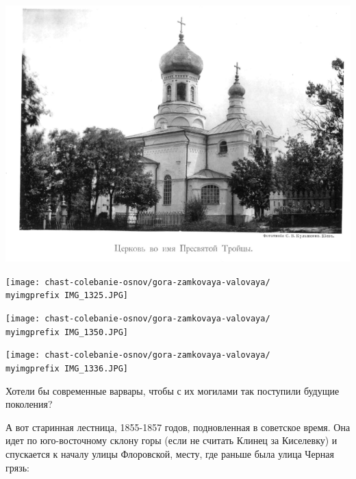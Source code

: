 \vspace*{\fill}
\begin{center}
\includegraphics[width=\linewidth]{chast-colebanie-osnov/gora-zamkovaya-valovaya/kiselevka-troick-cerk-1894.png}
\end{center}

\begin{center}
\texttt{[image: chast-colebanie-osnov/gora-zamkovaya-valovaya/\\myimgprefix IMG\_1325.JPG]}
\end{center}
\vspace*{\fill}
\newpage

\begin{center}
\texttt{[image: chast-colebanie-osnov/gora-zamkovaya-valovaya/\\myimgprefix IMG\_1350.JPG]}
\end{center}

\begin{center}
\texttt{[image: chast-colebanie-osnov/gora-zamkovaya-valovaya/\\myimgprefix IMG\_1336.JPG]}
\end{center}

Хотели бы современные варвары, чтобы с их могилами так поступили будущие поколения?

А вот старинная лестница, 1855-1857 годов, подновленная в советское время. Она идет по юго-восточному склону горы (если не считать Клинец за Киселевку) и спускается к началу улицы Флоровской, месту, где раньше была улица Черная грязь:


